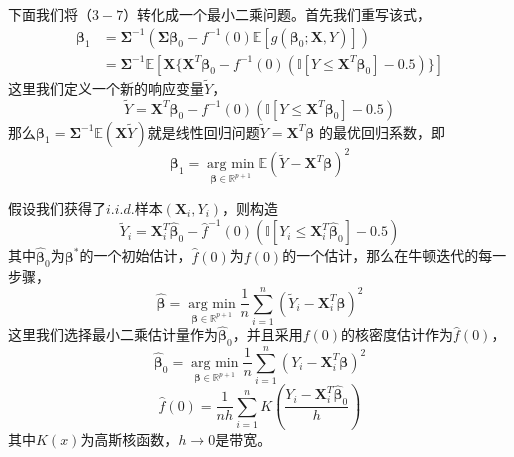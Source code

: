 下面我们将（$3-7$）转化成一个最小二乘问题。首先我们重写该式，
\begin{equation*}
    \begin{split}
    \bm{\beta}_1 &= \bm{\Sigma}^{-1}(\bm{\Sigma}\bm{\beta}_0 - f^{-1}(0)\mathbb{E}[g(\bm{\beta}_0;\bm{X},Y)])\\
    &= \bm{\Sigma}^{-1}\mathbb{E}[\bm{X}\{\bm{X}^T\bm{\beta}_0 - f^{-1}(0)(\mathbb{I}[Y \leq \bm{X}^T\bm{\beta}_0] - 0.5)\}]
    \end{split}
\end{equation*}
这里我们定义一个新的响应变量$\tilde Y$，
$$
    \tilde Y = \bm{X}^T\bm{\beta}_0 - f^{-1}(0) (\mathbb{I}[Y \leq \bm{X}^T\bm{\beta}_0] - 0.5)
$$
那么$\bm{\beta}_1 = \bm{\Sigma}^{-1}\mathbb{E}(\bm{X}\tilde{Y})$就是线性回归问题$\tilde Y = \bm{X}^T\bm{\beta}$
的最优回归系数，即
$$
    \bm{\beta}_1 = \underset{\bm{\beta} \in \mathbb{R}^{p+1}}{\operatorname{arg\ min}} 
    \mathbb{E}(\tilde Y - \bm{X}^T \bm{\beta})^2
$$

假设我们获得了$i.i.d.$样本$(\bm{X}_i, Y_i)$，则构造
$$
    \tilde{Y}_i = \bm{X}_i^T\hat{\bm{\beta}}_0 - \hat{f}^{-1}(0)
    (\mathbb{I}[Y_i \leq \bm{X}_i^T \hat{\bm{\beta}}_0] - 0.5)
$$
其中$\hat{\bm{\beta}}_0$为$\bm{\beta}^*$的一个初始估计，$\hat{f}(0)$为$f(0)$的一个估计，那么在牛顿迭代的每一步骤，
$$
    \hat{\bm{\beta}} = \underset{\bm{\beta} \in \mathbb{R}^{p+1}}{\operatorname{arg\ min}}
    \frac1{n} \sum_{i=1}^n(\tilde{Y}_i - \bm{X}_i^T\bm{\beta})^2
$$
这里我们选择最小二乘估计量作为$\hat{\bm{\beta}}_0$，并且采用$f(0)$的核密度估计作为$\hat{f}(0)$，
$$
    \hat{\bm{\beta}}_0 = \underset{\bm{\beta} \in \mathbb{R}^{p+1}}{\operatorname {arg\ min}}
    \frac1{n} \sum_{i=1}^n(Y_i - \bm{X}_i^T\bm{\beta})^2
$$
$$
    \hat{f}(0) = \frac1{nh}\sum_{i=1}^nK(\frac{Y_i - \bm{X}^T_i\hat{\bm{\beta}}_0}{h})
$$
其中$K(x)$为高斯核函数，$h \rightarrow 0$是带宽。

